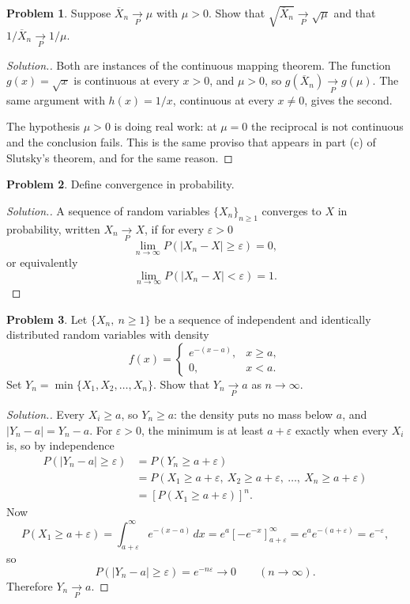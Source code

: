 \documentclass[11pt,a4paper]{article}
\theoremstyle{definition}
\newtheorem{problemx}{Problem}[subsection]
\newenvironment{problem}{\begin{problemx}}{\end{problemx}}
\newenvironment{solution}
  {\renewcommand{\qedsymbol}{}\begin{proof}[\textit{Solution}.]}
  {\end{proof}}
\begin{document}
\begin{problem}
Suppose $\overline{X}_n \underset{P}{\longrightarrow} \mu$ with $\mu>0$. Show
that $\sqrt{\overline{X}_n} \underset{P}{\longrightarrow} \sqrt{\mu}$ and that
$1/\overline{X}_n \underset{P}{\longrightarrow} 1/\mu$.
\end{problem}
\begin{solution}
Both are instances of the continuous mapping theorem. The function
$g(x)=\sqrt{x}$ is continuous at every $x>0$, and $\mu>0$, so
$g\left(\overline{X}_n\right)\underset{P}{\longrightarrow}g(\mu)$. The same
argument with $h(x)=1/x$, continuous at every $x\neq0$, gives the second.

The hypothesis $\mu>0$ is doing real work: at $\mu=0$ the reciprocal is not
continuous and the conclusion fails. This is the same proviso that appears in
part (c) of Slutsky's theorem, and for the same reason.
\end{solution}

\begin{problem}
Define convergence in probability.
\end{problem}
\begin{solution}
A sequence of random variables $\{X_n\}_{n\geq1}$ converges to $X$ in
probability, written $X_n\underset{P}{\longrightarrow}X$, if for every
$\varepsilon>0$
$$\lim_{n\rightarrow\infty}P\left(|X_n-X|\geq\varepsilon\right) = 0 ,$$
or equivalently
$$\lim_{n\rightarrow\infty}P\left(|X_n-X|<\varepsilon\right) = 1 .$$
\end{solution}

\begin{problem}
Let $\{X_n,\ n\geq1\}$ be a sequence of independent and identically distributed
random variables with density
$$f(x) = \begin{cases} e^{-(x-a)}, & x\geq a,\\ 0, & x<a.\end{cases}$$
Set $Y_n=\min\{X_1,X_2,\dots,X_n\}$. Show that
$Y_n\underset{P}{\longrightarrow}a$ as $n\rightarrow\infty$.
\end{problem}
\begin{solution}
Every $X_i\geq a$, so $Y_n\geq a$: the density puts no mass below $a$, and
$|Y_n-a| = Y_n-a$. For $\varepsilon>0$, the minimum is at least $a+\varepsilon$
exactly when every $X_i$ is, so by independence
\begin{align*}
P\left(|Y_n-a|\geq\varepsilon\right) &= P\left(Y_n\geq a+\varepsilon\right)\\
&= P\left(X_1\geq a+\varepsilon,\ X_2\geq a+\varepsilon,\ \dots,\
X_n\geq a+\varepsilon\right)\\
&= \left[P\left(X_1\geq a+\varepsilon\right)\right]^{n}.
\end{align*}
Now
$$P\left(X_1\geq a+\varepsilon\right) = \int_{a+\varepsilon}^{\infty}e^{-(x-a)}\,dx
= e^{a}\left[-e^{-x}\right]_{a+\varepsilon}^{\infty}
= e^{a}e^{-(a+\varepsilon)} = e^{-\varepsilon},$$
so
$$P\left(|Y_n-a|\geq\varepsilon\right) = e^{-n\varepsilon}\longrightarrow0
\qquad(n\rightarrow\infty).$$
Therefore $Y_n\underset{P}{\longrightarrow}a$.
\end{solution}
\end{document}
